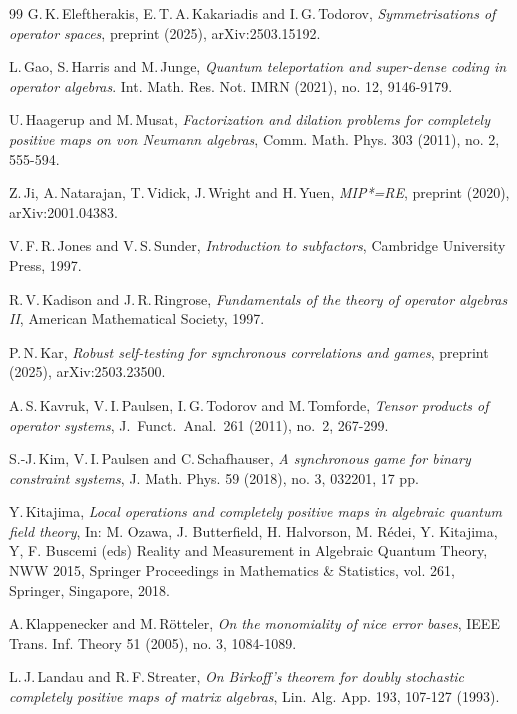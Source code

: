 \documentclass[11pt]{amsart}
\theoremstyle{definition}
\begin{document}
\begin{thebibliography}{99}
{\sc G.\,K.\,Eleftherakis, E.\,T.\,A.\,Kakariadis and I.\,G.\,Todorov},
{\it Symmetrisations of operator spaces},
{\rm preprint (2025), arXiv:2503.15192}. 

{\sc L.\,Gao, S.\,Harris and M.\,Junge},
{\it Quantum teleportation and super-dense coding in operator algebras}.
{\rm Int. Math. Res. Not. IMRN (2021), no. 12, 9146-9179}.

{\sc U.\,Haagerup and M.\,Musat},
\textit{Factorization and dilation problems for completely positive maps on von Neumann algebras},
{\rm Comm. Math. Phys. 303 (2011), no. 2, 555-594}.


{\sc Z.\,Ji, A.\,Natarajan, T.\,Vidick, J.\,Wright and H.\,Yuen},
{\it MIP*=RE},
{\rm preprint (2020), arXiv:2001.04383}.



{\sc V.\,F.\,R.\,Jones and V.\,S.\,Sunder},
{\it Introduction to subfactors},
{\rm Cambridge University Press, 1997}.


{\sc R.\,V.\,Kadison and J.\,R.\,Ringrose},
{\it Fundamentals of the theory of operator algebras II}, 
{\rm American Mathematical Society, 1997}.

{\sc P.\,N.\,Kar},
{\it Robust self-testing for synchronous correlations and games},
{\rm preprint (2025), arXiv:2503.23500}.


{\sc A.\,S.\,Kavruk, V.\,I.\,Paulsen, I.\,G.\,Todorov and M.\,Tomforde},
{\it Tensor products of operator systems},
{\rm J.\ Funct.\ Anal.\ 261 (2011), no.\ 2, 267-299}.

{\sc S.-J.\,Kim, V.\,I.\,Paulsen and C.\,Schafhauser},
{\it A synchronous game for binary constraint systems},
{\rm J. Math. Phys. 59 (2018), no. 3, 032201, 17 pp.}


{\sc Y.\,Kitajima},
{\it Local operations and completely positive maps in algebraic quantum field theory},
{\rm In: M. Ozawa, J. Butterfield, H. Halvorson, M. R\'{e}dei, Y. Kitajima, Y, F. Buscemi (eds) Reality and Measurement in Algebraic Quantum Theory, NWW 2015, Springer Proceedings in Mathematics \& Statistics, vol. 261, Springer, Singapore, 2018}.

{\sc A.\,Klappenecker and M.\,R\"{o}tteler},
{\it On the monomiality of nice error bases},
{\rm IEEE Trans. Inf. Theory 51 (2005), no. 3, 1084-1089}.

{\sc L.\,J.\,Landau and R.\,F.\,Streater},
{\it On Birkoff's theorem for doubly stochastic completely positive maps of matrix algebras},
{\rm Lin. Alg. App. 193, 107-127 (1993)}.


\end{thebibliography}
\end{document}
